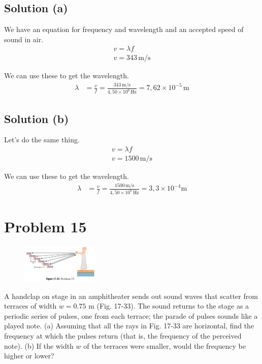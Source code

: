 \documentclass[12pt]{article}
\newcommand{\E}[1]{\times 10^{#1}}
\begin{document}
        \subsection{Solution (a)}
            We have an equation for frequency and wavelength and an accepted speed of sound in air.
            \begin{gather}
                v   =   \lambda f\\
                v   =   343\,\unit{\meter/\second}
            \end{gather}

            We can use these to get the wavelength.
            \begin{align}
                \lambda &=  \frac{v}{f}
                    =   \frac{343\,\unit{\meter/\second}}{4,50\E{6}\,\unit{\hertz}}
                    =   \boxed{7,62\E{-5}\,\unit{\meter}}
            \end{align}

        \subsection{Solution (b)}
            Let's do the same thing.
            \begin{gather}
                v   =   \lambda f\\
                v   =   1500\,\unit{\meter/\second}
            \end{gather}

            We can use these to get the wavelength.
            \begin{align}
                \lambda &=  \frac{v}{f}
                    =   \frac{1500\,\unit{\meter/\second}}{4,50\E{6}\,\unit{\hertz}}
                    =   \boxed{3,3\E{-4}\unit{\meter}}
            \end{align}

    \pagebreak
    \section{Problem 15}
        \begin{figure}
            \includegraphics[width=0.33\textwidth]{17-33.png} 
        \end{figure}
        A handclap on stage in an amphitheater sends out sound waves that scatter from terraces of width $w = 0.75$ m (Fig. 17-33). 
        The sound returns to the stage as a periodic series of pulses, one from each terrace; the parade of pulses sounds like a played note. 
        (a) Assuming that all the rays in Fig. 17-33 are horizontal, find the frequency at which the pulses return (that is, the frequency of the perceived note). 
        (b) If the width $w$ of the terraces were smaller, would the frequency be higher or lower?
\end{document}

